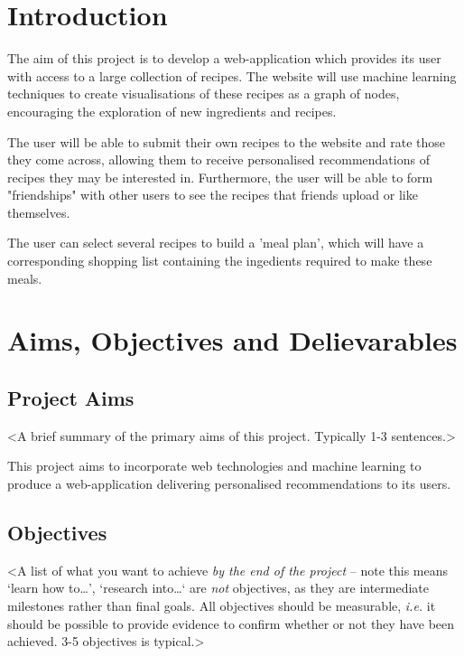 %
%
\section{Introduction}

The aim of this project is to develop a web-application which provides its user with access to a large collection of recipes. The website will use machine learning techniques to create visualisations of these recipes as a graph of nodes, encouraging the exploration of new ingredients and recipes.

The user will be able to submit their own recipes to the website and rate those they come across, allowing them to receive personalised recommendations of recipes they may be interested in. Furthermore, the user will be able to form "friendships" with other users to see the recipes that friends upload or like themselves.

The user can select several recipes to build a 'meal plan', which will have a corresponding shopping list containing the ingedients required to make these meals. 

%
%
\section{Aims, Objectives and Delievarables}

\subsection{Project Aims}
<A brief summary of the primary aims of this project. Typically 1-3 sentences.>

This project aims to incorporate web technologies and machine learning to produce a web-application delivering personalised recommendations to its users. 

\subsection{Objectives}

<A list of what you want to achieve {\em by the end of the project} -- note this means `learn how to\ldots', `research into\ldots` are {\em not} objectives, as they are intermediate milestones rather than final goals. All objectives should be measurable, {\em i.e.} it should be possible to provide evidence to confirm whether or not they have been achieved. 3-5 objectives is typical.>

